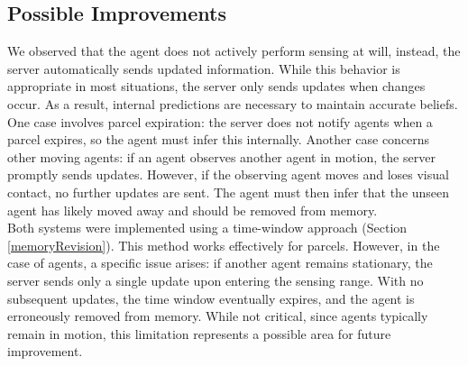     \subsection{Possible Improvements}
        We observed that the agent does not actively perform sensing at will, instead, the server automatically sends updated information. While this behavior is appropriate in most situations, the server only sends updates when changes occur. As a result, internal predictions are necessary to maintain accurate beliefs. One case involves parcel expiration: the server does not notify agents when a parcel expires, so the agent must infer this internally. Another case concerns other moving agents: if an agent observes another agent in motion, the server promptly sends updates. However, if the observing agent moves and loses visual contact, no further updates are sent. The agent must then infer that the unseen agent has likely moved away and should be removed from memory.
        \medskip\\
        Both systems were implemented using a time-window approach (Section \ref{memoryRevision}). This method works effectively for parcels. However, in the case of agents, a specific issue arises: if another agent remains stationary, the server sends only a single update upon entering the sensing range. With no subsequent updates, the time window eventually expires, and the agent is erroneously removed from memory. While not critical, since agents typically remain in motion, this limitation represents a possible area for future improvement.

\newpage

